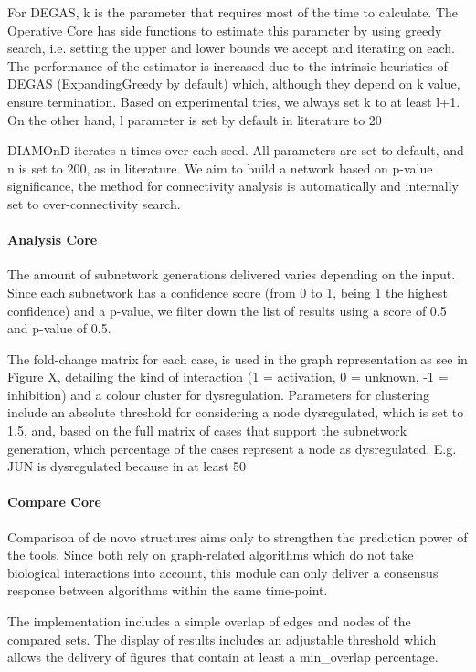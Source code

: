 For DEGAS, k is the parameter that requires most of the time to calculate. The Operative Core has side functions to estimate this parameter by using greedy search, i.e. setting the upper and lower bounds we accept and iterating on each. The performance of the estimator is increased due to the intrinsic heuristics of DEGAS (ExpandingGreedy by default) which, although they depend on k value, ensure termination. Based on experimental tries, we always set k to at least l+1. 
On the other hand, l parameter is set by default in literature to 20%

DIAMOnD iterates n times over each seed. All parameters are set to default, and n is set to 200, as in literature. We aim to build a network based on p-value significance, the method for connectivity analysis is automatically and internally set to over-connectivity search.

\paragraph{Analysis Core}
The amount of subnetwork generations delivered varies depending on the input. Since each subnetwork has a confidence score (from 0 to 1, being 1 the highest confidence) and a p-value, we filter down the list of results using a score of 0.5 and p-value of 0.5.

The fold-change matrix for each case, is used in the graph representation as see in Figure X, detailing the kind of interaction (1 = activation, 0 = unknown, -1 = inhibition) and a colour cluster for dysregulation. Parameters for clustering include an absolute threshold for considering a node dysregulated, which is set to 1.5, and, based on the full matrix of cases that support the subnetwork generation, which percentage of the cases represent a node as dysregulated. E.g. JUN is dysregulated because in at least 50%


\paragraph{Compare Core}
Comparison of de novo structures aims only to strengthen the prediction power of the tools. Since both rely on graph-related algorithms which do not take biological interactions into account, this module can only deliver a consensus response between algorithms within the same time-point.


The implementation includes a simple overlap of edges and nodes of the compared sets. The display of results includes an adjustable threshold which allows the delivery of figures that contain at least a min\_overlap percentage.



